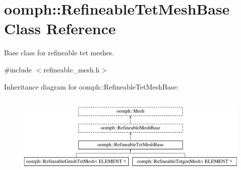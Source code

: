 \hypertarget{classoomph_1_1RefineableTetMeshBase}{}\section{oomph\+:\+:Refineable\+Tet\+Mesh\+Base Class Reference}
\label{classoomph_1_1RefineableTetMeshBase}


Base class for refineable tet meshes.  




{\ttfamily \#include $<$refineable\+\_\+mesh.\+h$>$}

Inheritance diagram for oomph\+:\+:Refineable\+Tet\+Mesh\+Base\+:\begin{figure}[H]
\begin{center}
\leavevmode
\includegraphics[height=3.943662cm]{classoomph_1_1RefineableTetMeshBase}
\end{center}
\end{figure}
